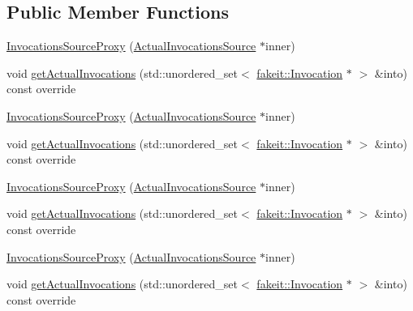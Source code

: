 \subsection*{Public Member Functions}
\begin{DoxyCompactItemize}
\item 
\mbox{\hyperlink{structfakeit_1_1InvocationsSourceProxy_a2628cc72ce5694e87d7b1208dd3c6518}{Invocations\+Source\+Proxy}} (\mbox{\hyperlink{structfakeit_1_1ActualInvocationsSource}{Actual\+Invocations\+Source}} $\ast$inner)
\item 
void \mbox{\hyperlink{structfakeit_1_1InvocationsSourceProxy_af06b5d62b0c4ff1e3048fae5d7ddd8c3}{get\+Actual\+Invocations}} (std\+::unordered\+\_\+set$<$ \mbox{\hyperlink{structfakeit_1_1Invocation}{fakeit\+::\+Invocation}} $\ast$ $>$ \&into) const override
\item 
\mbox{\hyperlink{structfakeit_1_1InvocationsSourceProxy_a2628cc72ce5694e87d7b1208dd3c6518}{Invocations\+Source\+Proxy}} (\mbox{\hyperlink{structfakeit_1_1ActualInvocationsSource}{Actual\+Invocations\+Source}} $\ast$inner)
\item 
void \mbox{\hyperlink{structfakeit_1_1InvocationsSourceProxy_af06b5d62b0c4ff1e3048fae5d7ddd8c3}{get\+Actual\+Invocations}} (std\+::unordered\+\_\+set$<$ \mbox{\hyperlink{structfakeit_1_1Invocation}{fakeit\+::\+Invocation}} $\ast$ $>$ \&into) const override
\item 
\mbox{\hyperlink{structfakeit_1_1InvocationsSourceProxy_a2628cc72ce5694e87d7b1208dd3c6518}{Invocations\+Source\+Proxy}} (\mbox{\hyperlink{structfakeit_1_1ActualInvocationsSource}{Actual\+Invocations\+Source}} $\ast$inner)
\item 
void \mbox{\hyperlink{structfakeit_1_1InvocationsSourceProxy_af06b5d62b0c4ff1e3048fae5d7ddd8c3}{get\+Actual\+Invocations}} (std\+::unordered\+\_\+set$<$ \mbox{\hyperlink{structfakeit_1_1Invocation}{fakeit\+::\+Invocation}} $\ast$ $>$ \&into) const override
\item 
\mbox{\hyperlink{structfakeit_1_1InvocationsSourceProxy_a2628cc72ce5694e87d7b1208dd3c6518}{Invocations\+Source\+Proxy}} (\mbox{\hyperlink{structfakeit_1_1ActualInvocationsSource}{Actual\+Invocations\+Source}} $\ast$inner)
\item 
void \mbox{\hyperlink{structfakeit_1_1InvocationsSourceProxy_af06b5d62b0c4ff1e3048fae5d7ddd8c3}{get\+Actual\+Invocations}} (std\+::unordered\+\_\+set$<$ \mbox{\hyperlink{structfakeit_1_1Invocation}{fakeit\+::\+Invocation}} $\ast$ $>$ \&into) const override
\item 

\end{DoxyCompactItemize}
